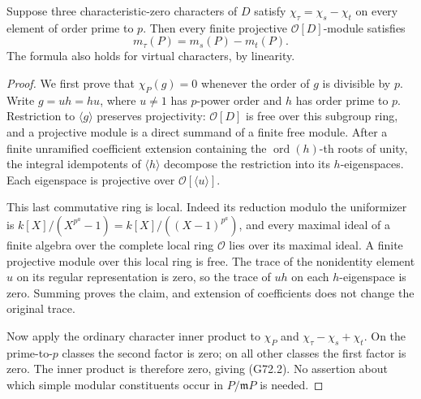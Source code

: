 \begin{lemma}
\label{G72-projective-character}
Suppose three characteristic-zero characters of \(D\) satisfy
\(\chi_\tau=\chi_s-\chi_t\) on every element of order prime to \(p\).
Then every finite projective \(\mathcal O[D]\)-module satisfies
\[
                  m_\tau(P)=m_s(P)-m_t(P).
 \tag{G72.2}
\]
The formula also holds for virtual characters, by linearity.
\end{lemma}
\begin{proof}
We first prove that \(\chi_P(g)=0\) whenever the order of \(g\)
is divisible by \(p\).  Write \(g=uh=hu\), where \(u\ne1\)
has \(p\)-power order and \(h\) has order prime to \(p\).
Restriction to \(\langle g\rangle\) preserves projectivity:
\(\mathcal O[D]\) is free over this subgroup ring, and a
projective module is a direct summand of a finite free module.
After a finite unramified coefficient extension containing the
\(\operatorname{ord}(h)\)-th roots of unity, the integral idempotents
of \(\langle h\rangle\) decompose the restriction into its
\(h\)-eigenspaces.  Each eigenspace is projective over
\(\mathcal O[\langle u\rangle]\).

This last commutative ring is local.  Indeed its reduction modulo the
uniformizer is \(k[X]/(X^{p^a}-1)=k[X]/((X-1)^{p^a})\), and every
maximal ideal of a finite algebra over the complete local ring
\(\mathcal O\) lies over its maximal ideal.  A finite projective
module over this local ring is free.  The trace of the nonidentity
element \(u\) on its regular representation is zero, so the trace
of \(uh\) on each \(h\)-eigenspace is zero.  Summing proves the
claim, and extension of coefficients does not change the original
trace.

Now apply the ordinary character inner product to \(\chi_P\)
and \(\chi_\tau-\chi_s+\chi_t\).  On the prime-to-\(p\)
classes the second factor is zero; on all other classes the first
factor is zero.  The inner product is therefore zero, giving
(G72.2).  No assertion about which simple modular constituents
occur in \(P/\mathfrak mP\) is needed.
\end{proof}

